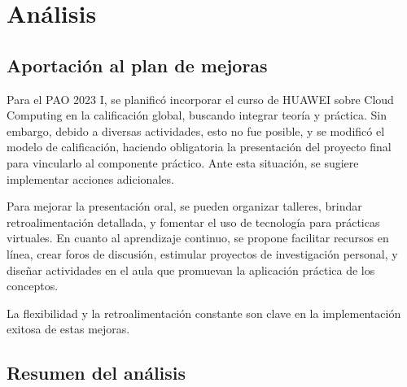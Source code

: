 \section{Análisis}
\subsection{Aportación al plan de mejoras}
Para el PAO 2023 I, se planificó incorporar el curso de HUAWEI sobre Cloud Computing en la calificación global, buscando integrar teoría y práctica. Sin embargo, debido a diversas actividades, esto no fue posible, y se modificó el modelo de calificación, haciendo obligatoria la presentación del proyecto final para vincularlo al componente práctico. Ante esta situación, se sugiere implementar acciones adicionales. 

Para mejorar la presentación oral, se pueden organizar talleres, brindar retroalimentación detallada, y fomentar el uso de tecnología para prácticas virtuales. En cuanto al aprendizaje continuo, se propone facilitar recursos en línea, crear foros de discusión, estimular proyectos de investigación personal, y diseñar actividades en el aula que promuevan la aplicación práctica de los conceptos. 

La flexibilidad y la retroalimentación constante son clave en la implementación exitosa de estas mejoras.

\subsection{Resumen del análisis}

